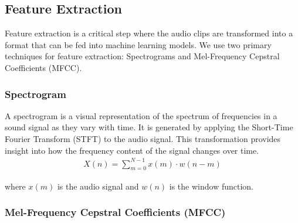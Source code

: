 \subsection{Feature Extraction}
Feature extraction is a critical step where the audio clips are transformed
into a format that can be fed into machine learning models. We use two primary
techniques for feature extraction: Spectrograms and Mel-Frequency Cepstral
Coefficients (MFCC).

\subsubsection{Spectrogram}
A spectrogram is a visual representation of the spectrum of frequencies in a
sound signal as they vary with time. It is generated by applying the Short-Time
Fourier Transform (STFT) to the audio signal. This transformation provides
insight into how the frequency content of the signal changes over time.
\begin{eqnarray}
    X(n) = \sum_{m=0}^{N-1} x(m) \cdot w(n-m)
\end{eqnarray}

where \( x(m) \) is the audio signal and \( w(n) \) is the window function.

\subsubsection{Mel-Frequency Cepstral Coefficients (MFCC)}

